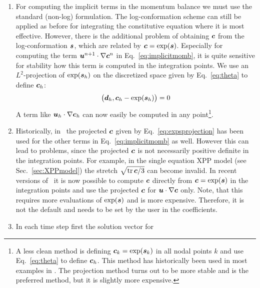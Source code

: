 \begin{enumerate}
         limitations depending on the solution.
   \item For computing the implicit terms in the momentum balance we
         must use the standard (non-log) formulation.
         The log-conformation scheme
         can still be applied as before for integrating the constitutive
         equation where it is most effective. However, there is the additional
         problem of obtaining $\boldsymbol{c}$ from the log-conformation $\boldsymbol{s}$, which
         are related by $\boldsymbol{c}=\exp(\boldsymbol{s})$. Especially for computing the
         term $\boldsymbol{u}^{n+1}\cdot\nabla\boldsymbol{c}^n$ in Eq.~\eqref{eq:implicitmomb},
         it is quite sensitive for stability how this term is computed in the
         integration points. We use an $L^2$-projection of $\exp(\boldsymbol{s}_h)$ on
         the discretized space given by Eq.~\eqref{eq:theta} to define 
         $\boldsymbol{c}_h$:
\begin{equation}
          \big(\boldsymbol{d}_h,\boldsymbol{c}_h-\exp(\boldsymbol{s}_h)\big)=0
          \label{eq:expsprojection}
\end{equation}
         A term like $\boldsymbol{u}_h\cdot\nabla\boldsymbol{c}_h$ can now easily be
         computed in any point\footnote{A less clean method is defining
         $\boldsymbol{c}_k=\exp(\boldsymbol{s}_k)$ in all nodal points $k$ and use
         Eq.~\eqref{eq:theta} to define $\boldsymbol{c}_h$. This method has
         historically been used in most examples in
         \tfem. The projection method turns out to be more
         stable and is the preferred method, but it is slightly more expensive.}. 
   \item Historically, in \tfem\ the 
         projected $\boldsymbol{c}$ given by Eq.~\eqref{eq:expsprojection}
         has been used for the other terms in Eq.~\eqref{eq:implicitmomb} as well. 
         However this can lead to problems, since
         the projected $\boldsymbol{c}$ is not necessarily positive definite in the integration points. 
         For example, in the single equation XPP model (see Sec.~\ref{sec:XPPmodel}) the 
         stretch $\sqrt{\operatorname{tr}\boldsymbol{c}/3}$ can become invalid.
         In recent versions
         of \tfem\ it is now possible to compute $\boldsymbol{c}$ directly from $\boldsymbol{c}=\exp(\boldsymbol{s})$ in the integration
         points and use the projected $\boldsymbol{c}$ for $\boldsymbol{u}\cdot\nabla\boldsymbol{c}$ only. Note, that this requires more 
         evaluations of $\exp(\boldsymbol{s})$ and is more expensive. Therefore, it is not the default and needs to be 
         set by the user in the coefficients.
   \item In each time step first the solution vector for

\end{enumerate}
